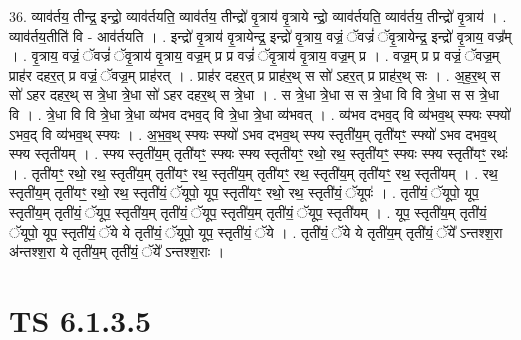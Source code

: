 \documentclass[17pt]{extarticle}
\begin{document}
36. व्याव॑र्तय॒ तीन्द्र॒ इन्द्रो॒ व्याव॑र्तयति॒ व्याव॑र्तय॒ तीन्द्रो॑ वृ॒त्राय॑ वृ॒त्राये न्द्रो॒ व्याव॑र्तयति॒ व्याव॑र्तय॒ तीन्द्रो॑ वृ॒त्राय॑ । . व्याव॑र्तय॒तीति॑ वि - आव॑र्तयति । . इन्द्रो॑ वृ॒त्राय॑ वृ॒त्रायेन्द्र॒ इन्द्रो॑ वृ॒त्राय॒ वज्रं॒ ॅवज्रं॑ ॅवृ॒त्रायेन्द्र॒ इन्द्रो॑ वृ॒त्राय॒ वज्र᳚म् । . वृ॒त्राय॒ वज्रं॒ ॅवज्रं॑ ॅवृ॒त्राय॑ वृ॒त्राय॒ वज्र॒म् प्र प्र वज्रं॑ ॅवृ॒त्राय॑ वृ॒त्राय॒ वज्र॒म् प्र । . वज्र॒म् प्र प्र वज्रं॒ ॅवज्र॒म् प्राह॑र दहर॒त् प्र वज्रं॒ ॅवज्र॒म् प्राह॑रत् । . प्राह॑र दहर॒त् प्र प्राह॑र॒थ् स सो॑ ऽहर॒त् प्र प्राह॑र॒थ् सः । . अ॒ह॒र॒थ् स सो॑ ऽहर दहर॒थ् स त्रे॒धा त्रे॒धा सो॑ ऽहर दहर॒थ् स त्रे॒धा । . स त्रे॒धा त्रे॒धा स स त्रे॒धा वि वि त्रे॒धा स स त्रे॒धा वि । . त्रे॒धा वि वि त्रे॒धा त्रे॒धा व्य॑भव दभव॒द् वि त्रे॒धा त्रे॒धा व्य॑भवत् । . व्य॑भव दभव॒द् वि व्य॑भव॒थ् स्फ्यः स्फ्यो॑ ऽभव॒द् वि व्य॑भव॒थ् स्फ्यः । . अ॒भ॒व॒थ् स्फ्यः स्फ्यो॑ ऽभव दभव॒थ् स्फ्य स्तृती॑य॒म् तृती॑यꣳ॒॒ स्फ्यो॑ ऽभव दभव॒थ् स्फ्य स्तृती॑यम् । . स्फ्य स्तृती॑य॒म् तृती॑यꣳ॒॒ स्फ्यः स्फ्य स्तृती॑यꣳ॒॒ रथो॒ रथ॒ स्तृती॑यꣳ॒॒ स्फ्यः स्फ्य स्तृती॑यꣳ॒॒ रथः॑ । . तृती॑यꣳ॒॒ रथो॒ रथ॒ स्तृती॑य॒म् तृती॑यꣳ॒॒ रथ॒ स्तृती॑य॒म् तृती॑यꣳ॒॒ रथ॒ स्तृती॑य॒म् तृती॑यꣳ॒॒ रथ॒ स्तृती॑यम् । . रथ॒ स्तृती॑य॒म् तृती॑यꣳ॒॒ रथो॒ रथ॒ स्तृती॑यं॒ ॅयूपो॒ यूप॒ स्तृती॑यꣳ॒॒ रथो॒ रथ॒ स्तृती॑यं॒ ॅयूपः॑ । . तृती॑यं॒ ॅयूपो॒ यूप॒ स्तृती॑य॒म् तृती॑यं॒ ॅयूप॒ स्तृती॑य॒म् तृती॑यं॒ ॅयूप॒ स्तृती॑य॒म् तृती॑यं॒ ॅयूप॒ स्तृती॑यम् । . यूप॒ स्तृती॑य॒म् तृती॑यं॒ ॅयूपो॒ यूप॒ स्तृती॑यं॒ ॅये ये तृती॑यं॒ ॅयूपो॒ यूप॒ स्तृती॑यं॒ ॅये । . तृती॑यं॒ ॅये ये तृती॑य॒म् तृती॑यं॒ ॅये᳚ ऽन्तश्श॒रा अ॑न्तश्श॒रा ये तृती॑य॒म् तृती॑यं॒ ॅये᳚ ऽन्तश्श॒राः । \newline
\pagebreak
{}

\section{ TS 6.1.3.5 }
\end{document}
